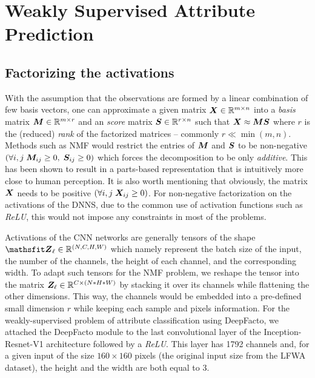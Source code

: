 \section{Weakly Supervised Attribute Prediction}\label{sec:weakly_sup}


\subsection*{Factorizing the activations}\label{sec:factor_layer} 

With the assumption that the observations are formed by a linear combination of few basis vectors, one can approximate a given matrix ${\bm{X}} \in \mathbb{R}^{m \times n}$ into a \textit{basis} matrix ${\bm{M}} \in \mathbb{R}^{m \times r}$ and an \textit{score} matrix ${\bm{S}} \in \mathbb{R}^{r \times n}$ such that ${\bm{X}} \approx {\bm{M}} {\bm{S}}$ where $r$ is the (reduced) \textit{rank} of the factorized matrices -- commonly $r \ll \min(m, n)$.
Methods such as NMF would restrict the entries of ${\bm{M}}$ and ${\bm{S}}$ to be non-negative $(\forall i,j \;  {\bm{M}}_{ij} \ge 0,\; {\bm{S}}_{ij} \ge 0)$ which forces the decomposition to be only \textit{additive}. This has been shown to result in a parts-based representation that is intuitively more close to human perception. It is also worth mentioning that obviously, the matrix ${\bm{X}}$ needs to be positive $({\forall i,j} \;  {\bm{X}}_{ij} \ge 0)$. For non-negative factorization on the activations of the DNNS, due to the common use of activation functions such as \textit{ReLU}, this would not impose any constraints in most of the problems.

Activations of the CNN networks are generally tensors of the shape $\tZ_{\ell} \in \R^{(N, C, H, W)}$ which namely represent the batch size of the input, the number of the channels, the height of each channel, and the corresponding width. To adapt such tensors for the NMF problem, we reshape the tensor into the matrix ${\bm{Z}}_{\ell} \in \mathbb{R}^{ C \times (N * H * W)}$ by stacking it over its channels while flattening the other dimensions. This way, the channels would be embedded into a pre-defined small dimension $r$ while keeping each sample and pixels information. For the weakly-supervised problem of attribute classification using DeepFacto, we attached the DeepFacto module to the last convolutional layer of the Inception-Resnet-V1 architecture followed by a \emph{ReLU}. This layer has 1792 channels and, for a given input of the size $160 \times 160$ pixels (the original input size from the LFWA dataset), the height and the width are both equal to 3. 

